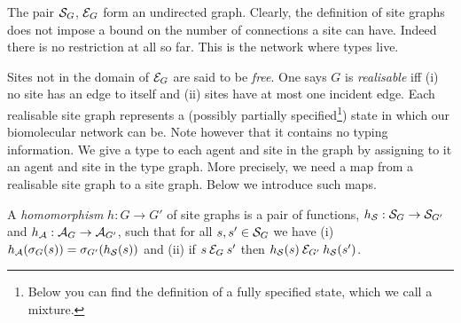 The pair $\mathcal{S}_G$, $\mathcal{E}_G$ form an undirected graph.
Clearly, the definition of site graphs does not impose
a bound on the number of connections a site can have.
Indeed there is no restriction at all so far.
This is the network where types live.

Sites not in the domain of $\mathcal{E}_G$ are said to be \emph{free}.
One says $G$ is \emph{realisable} iff
(i) no site has an edge to itself and
(ii) sites have at most one incident edge.
Each realisable site graph represents a
(possibly partially specified\footnote{
  Below you can find the definition of a fully specified state,
  which we call a mixture.})
state in which our biomolecular network can be.
Note however that it contains no typing information.
We give a type to each agent and site in the graph
by assigning to it an agent and site in the type graph.
More precisely,
we need a map from a realisable site graph to a site graph.
Below we introduce such maps.

\begin{flushleft}
\begin{minipage}{.66\linewidth}
\begin{definition}
  A \emph{homomorphism} $h: G \to G'$ of site graphs is
  a pair of functions, $h_{\mathcal{S}}: \mathcal{S}_G \to \mathcal{S}_{G'}$
  and $h_{\mathcal{A}}: \mathcal{A}_G \to \mathcal{A}_{G'}$, such that
  for all $s,s' \in \mathcal{S}_G$ we have
  (i) $h_{\mathcal{A}}(\sigma_G(s)) = \sigma_{G'}(h_{\mathcal{S}}(s))$
  and (ii) if $s \mathbin{\mathcal{E}_G} s'$ then
  $h_{\mathcal{S}}(s) \mathbin{\mathcal{E}_{G'}} h_{\mathcal{S}}(s')$.
\end{definition}
\end{minipage}
\begin{minipage}{.3\linewidth}
\begin{flushright}
\end{flushright}
\end{minipage}
\end{flushleft}

